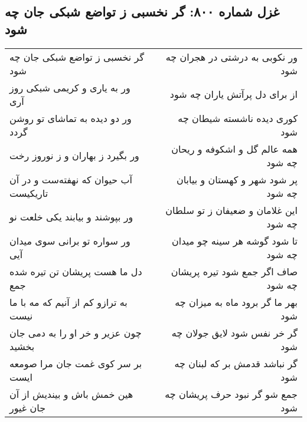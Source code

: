 \begin{center}
\section*{غزل شماره ۸۰۰: گر نخسبی ز تواضع شبکی جان چه شود}
\label{sec:0800}
\begin{longtable}{l p{0.5cm} r}
گر نخسبی ز تواضع شبکی جان چه شود
&&
ور نکوبی به درشتی در هجران چه شود
\\
ور به یاری و کریمی شبکی روز آری
&&
از برای دل پرآتش یاران چه شود
\\
ور دو دیده به تماشای تو روشن گردد
&&
کوری دیده ناشسته شیطان چه شود
\\
ور بگیرد ز بهاران و ز نوروز رخت
&&
همه عالم گل و اشکوفه و ریحان چه شود
\\
آب حیوان که نهفته‌ست و در آن تاریکیست
&&
پر شود شهر و کهستان و بیابان چه شود
\\
ور بپوشند و بیابند یکی خلعت نو
&&
این غلامان و ضعیفان ز تو سلطان چه شود
\\
ور سواره تو برانی سوی میدان آیی
&&
تا شود گوشه هر سینه چو میدان چه شود
\\
دل ما هست پریشان تن تیره شده جمع
&&
صاف اگر جمع شود تیره پریشان چه شود
\\
به ترازو کم از آنیم که مه با ما نیست
&&
بهر ما گر برود ماه به میزان چه شود
\\
چون عزیر و خر او را به دمی جان بخشید
&&
گر خر نفس شود لایق جولان چه شود
\\
بر سر کوی غمت جان مرا صومعه ایست
&&
گر نباشد قدمش بر که لبنان چه شود
\\
هین خمش باش و بیندیش از آن جان غیور
&&
جمع شو گر نبود حرف پریشان چه شود
\\
\end{longtable}
\end{center}
